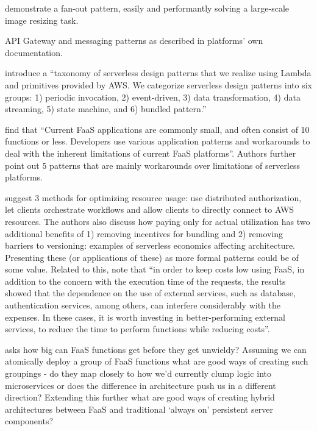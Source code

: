 \textcite{mcgrath16cloudEventParadigms} demonstrate a fan-out pattern, easily and performantly solving a large-scale image resizing task.

API Gateway and messaging patterns as described in platforms' own documentation. \parencite{awslambda0218}

\textcite{hong18securingviaserverlesspatterns} introduce a ``taxonomy of serverless design patterns that we realize using Lambda and primitives provided by AWS. We categorize serverless design patterns into six groups: 1) periodic invocation, 2) event-driven, 3) data transformation, 4) data streaming, 5) state machine, and 6) bundled pattern.''

\textcite{leitner18industrialpractice} find that ``Current FaaS applications are commonly small, and often consist of 10 functions or less. Developers use various application patterns and workarounds to deal with the inherent limitations of current FaaS platforms''. Authors further point out 5 patterns that are mainly workarounds over limitations of serverless platforms.

\textcite{adzic2017serverless} suggest 3 methods for optimizing resource usage: use distributed authorization, let clients orchestrate workflows and allow clients to directly connect to AWS resources. The authors also discuss how paying only for actual utilization has two additional benefits of 1) removing incentives for bundling and 2) removing barriers to versioning: examples of serverless economics affecting architecture. Presenting these (or applications of these) as more formal patterns could be of some value. Related to this, \textcite{albuquerque17faaspaas} note that ``in order to keep costs low using FaaS, in addition to the concern with the execution time of the requests, the results showed that the dependence on the use of external services, such as database, authentication services, among others, can interfere considerably with the expenses. In these cases, it is worth investing in better-performing external services, to reduce the time to perform functions while reducing costs''.

\textcite{robert2016serverlessarchitectures} asks how big can FaaS functions get before they get unwieldy? Assuming we can atomically deploy a group of FaaS functions what are good ways of creating such groupings - do they map closely to how we’d currently clump logic into microservices or does the difference in architecture push us in a different direction? Extending this further what are good ways of creating hybrid architectures between FaaS and traditional ‘always on’ persistent server components?


